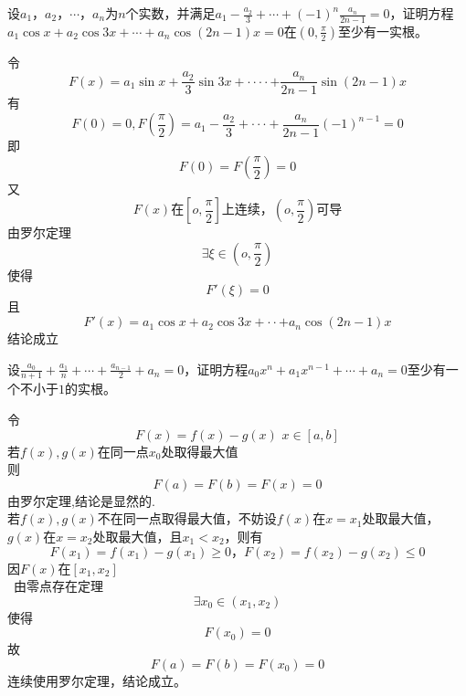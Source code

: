 \begin{example}
	设$a_1$，$a_2$，$\cdots$，$a_n$为$n$个实数，并满足$a_1-\frac{a_2}{3}+\cdots+(-1)^n\frac{a_n}{2n-1}=0$，证明方程$a_1\cos x+a_2\cos 3x+\cdots+a_n\cos (2n-1)x=0$在$(0,\frac{\pi}{2})$至少有一实根。
\end{example}
	\begin{newproof}
		令\[F\left( x \right) =a_1\sin x+\frac{a_2}{3}\sin 3x+\cdot \cdot \cdot \cdot +\frac{a_n}{2n-1}\sin \left( 2n-1 \right) x\]
		有\[F\left( 0 \right) =0,F\left( \frac{\pi}{2} \right) =a_1-\frac{a_2}{3}+\cdot \cdot \cdot +\frac{a_n}{2n-1}\left( -1 \right) ^{n-1}=0\]
		即\[F\left( 0 \right) =F\left( \frac{\pi}{2} \right) =0\]
		又\[F\left( x \right) \text{在}\left[ o,\frac{\pi}{2} \right] \text{上连续，}\left( o,\frac{\pi}{2} \right) \text{可导}\]
		由罗尔定理\[\exists \xi \in \left( o,\frac{\pi}{2} \right) \]
		使得\[F'\left( \xi \right) =0\]
		且\[F'\left( x \right) =a_1\cos x+a_2\cos 3x+\cdot \cdot +a_n\cos \left( 2n-1 \right) x\]
		结论成立
	\end{newproof}

\begin{example}
	设$\frac{a_0}{n+1}+\frac{a_1}{n}+\cdots+\frac{a_{n-1}}{2}+a_n=0$，证明方程$a_0x^n+a_1x^{n-1}+\cdots+a_n=0$至少有一个不小于$1$的实根。
\end{example}
	\begin{newproof}
		令\[F\left( x \right) =f\left( x \right) -g\left( x \right) \,\,   x\in \left[ a,b \right] \]
		若$f\left( x \right) ,g\left( x \right) $在同一点$x_0$处取得最大值\\
		则\[F\left( a \right) =F\left( b \right) =F\left( x \right) =0\]
		由罗尔定理,结论是显然的.\\
		若$f\left( x \right) ,g\left( x \right) $不在同一点取得最大值，不妨设$f\left( x \right) \text{在}x=x_1$处取最大值，$g\left( x \right) \text{在}x=x_2$处取最大值，且$x_1<x_2$，则有
		\[F\left( x_1 \right) =f\left( x_1 \right) -g\left( x_1 \right) \geqslant 0\text{，}F\left( x_2 \right) =f\left( x_2 \right) -g\left( x_2 \right) \leqslant 0\]
		因$F\left( x \right) \text{在}\left[ x_1,x_2 \right] $\\\
		由零点存在定理\[\exists x_0\in \left( x_1,x_2 \right) \]
		使得\[F\left( x_0 \right) =0\]
		故\[F\left( a \right) =F\left( b \right) =F\left( x_0 \right) =0\]
		连续使用罗尔定理，结论成立。
	\end{newproof}

